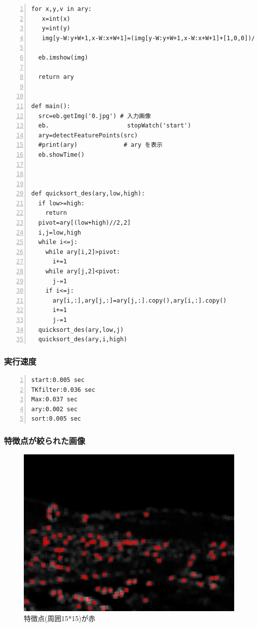 \documentclass[autodetect-engine,dvi=dvipdfmx,ja=standard,
               a4j,11pt]{bxjsarticle}
\begin{document}
\begin{Verbatim}[numbers=left, xleftmargin=10mm, numbersep=6pt,
                    fontsize=\small, baselinestretch=0.8]
  for x,y,v in ary:
   x=int(x)
   y=int(y)
   img[y-W:y+W+1,x-W:x+W+1]=(img[y-W:y+W+1,x-W:x+W+1]+[1,0,0])/2

  eb.imshow(img)

  return ary


def main():
  src=eb.getImg('0.jpg') # 入力画像
  eb.                      stopWatch('start')
  ary=detectFeaturePoints(src)
  #print(ary)             # ary を表示
  eb.showTime()



def quicksort_des(ary,low,high):
  if low>=high:
    return
  pivot=ary[(low+high)//2,2]
  i,j=low,high
  while i<=j:
    while ary[i,2]>pivot:
      i+=1
    while ary[j,2]<pivot:
      j-=1
    if i<=j:
      ary[i,:],ary[j,:]=ary[j,:].copy(),ary[i,:].copy()
      i+=1
      j-=1
  quicksort_des(ary,low,j)
  quicksort_des(ary,i,high)
\end{Verbatim}

\subsubsection{実行速度}
\begin{Verbatim}[numbers=left, xleftmargin=10mm, numbersep=6pt,
                    fontsize=\small, baselinestretch=0.8]
start:0.005 sec
TKfilter:0.036 sec
Max:0.037 sec
ary:0.002 sec
sort:0.005 sec
\end{Verbatim}


\subsubsection{特徴点が絞られた画像}
\begin{figure}[h]
 \centering
 \includegraphics[scale=.5]{5.2_features.jpg}
 \caption{特徴点(周囲15*15)が赤}
 \label{fig:5.2_features.jpg}
\end{figure}
\end{document}
